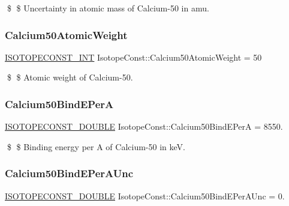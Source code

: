 \$ \$ Uncertainty in atomic mass of Calcium-\/50 in amu. \mbox{\label{group___isotope_const-_calcium-_ca50_gaca7f7bae555ed2acfbd43df9891154ff}} 
\subsubsection{\texorpdfstring{Calcium50\+Atomic\+Weight}{Calcium50AtomicWeight}}
{\footnotesize\ttfamily \mbox{\hyperlink{group___isotope_const-_macros_ga5f18360b3e99483a35c32d789e62621c}{I\+S\+O\+T\+O\+P\+E\+C\+O\+N\+S\+T\+\_\+\+I\+NT}} Isotope\+Const\+::\+Calcium50\+Atomic\+Weight = 50}

\$ \$ Atomic weight of Calcium-\/50. \mbox{\label{group___isotope_const-_calcium-_ca50_gaeeeb58f7a8b75d1c5a295de244645dd9}} 
\subsubsection{\texorpdfstring{Calcium50\+Bind\+E\+PerA}{Calcium50BindEPerA}}
{\footnotesize\ttfamily \mbox{\hyperlink{group___isotope_const-_macros_ga8f45a7272ce02c0b4c65c44636ed719a}{I\+S\+O\+T\+O\+P\+E\+C\+O\+N\+S\+T\+\_\+\+D\+O\+U\+B\+LE}} Isotope\+Const\+::\+Calcium50\+Bind\+E\+PerA = 8550.}

\$ \$ Binding energy per A of Calcium-\/50 in keV. \mbox{\label{group___isotope_const-_calcium-_ca50_gaa8a8b6c2276e4a756f4762fc930191d6}} 
\subsubsection{\texorpdfstring{Calcium50\+Bind\+E\+Per\+A\+Unc}{Calcium50BindEPerAUnc}}
{\footnotesize\ttfamily \mbox{\hyperlink{group___isotope_const-_macros_ga8f45a7272ce02c0b4c65c44636ed719a}{I\+S\+O\+T\+O\+P\+E\+C\+O\+N\+S\+T\+\_\+\+D\+O\+U\+B\+LE}} Isotope\+Const\+::\+Calcium50\+Bind\+E\+Per\+A\+Unc = 0.}

